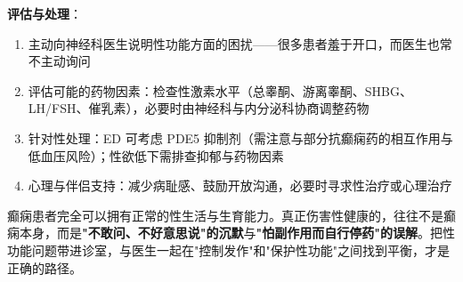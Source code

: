 \vspace{0.5em}
\noindent\textbf{评估与处理}：

\begin{enumerate}
	\item 主动向神经科医生说明性功能方面的困扰——很多患者羞于开口，而医生也常不主动询问
	\item 评估可能的药物因素：检查性激素水平（总睾酮、游离睾酮、SHBG、LH/FSH、催乳素），必要时由神经科与内分泌科协商调整药物
	\item 针对性处理：ED 可考虑 PDE5 抑制剂（需注意与部分抗癫痫药的相互作用与低血压风险）；性欲低下需排查抑郁与药物因素
	\item 心理与伴侣支持：减少病耻感、鼓励开放沟通，必要时寻求性治疗或心理治疗
\end{enumerate}

\begin{tcolorbox}[colback=pink!5!white,colframe=red!50!black,title=贴心小叮咛]
癫痫患者完全可以拥有正常的性生活与生育能力。真正伤害性健康的，往往不是癫痫本身，而是\textbf{"不敢问、不好意思说"的沉默}与\textbf{"怕副作用而自行停药"的误解}。把性功能问题带进诊室，与医生一起在"控制发作"和"保护性功能"之间找到平衡，才是正确的路径。
\end{tcolorbox}
